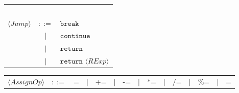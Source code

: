 \documentclass{report}
\newcommand{\nonterm}[1]{\langle #1 \rangle}
\newcommand{\term}[1]{\texttt{#1}}
\begin{document}
\begin{itemize}
\begin{flushleft}
\begin{tabular}{l c l}
        \                   &    \      &   \                                                                                   \\
        $\nonterm{Jump}$    &   $::=$   &   $\term{break}$                                                                      \\
                            &    $|$    &   $\term{continue}$                                                                   \\
                            &    $|$    &   $\term{return}$                                                                     \\
                            &    $|$    &   $\term{return } \nonterm{RExp}$

        \end{tabular}
        \end{flushleft}

        \begin{flushleft}
        \begin{tabular}{*{15}c}
        $\nonterm{AssignOp}$    &   $::=$   &   $\term{=}$                                           
                                &    $|$    &   $\term{+=}$                                          
                                &    $|$    &   $\term{-=}$                                        
                                &    $|$    &   $\term{*=}$                                          
                                &    $|$    &   $\term{/=}$                                     
                                &    $|$    &   $\term{\%=}$                                    
                                &    $|$    &   $\term{\^{}=}$
        \end{tabular}
        \end{flushleft}


\end{itemize}
\end{document}
